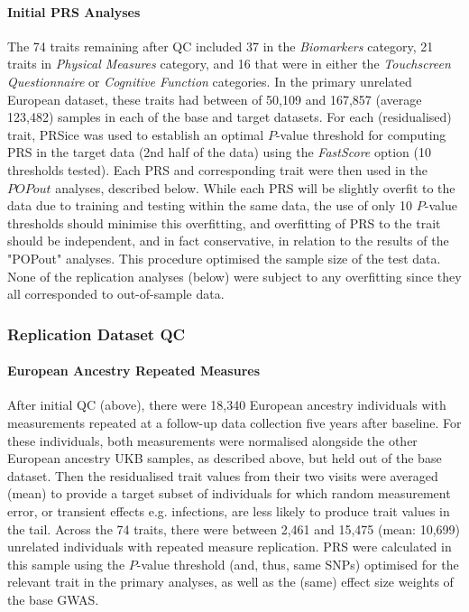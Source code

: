 \documentclass[12pt]{zHenriquesLab-StyleBioRxiv}
\begin{document}
\paragraph*{Initial PRS Analyses}
The 74 traits remaining after QC included 37 in the \textit{Biomarkers} category, 
21 traits in \textit{Physical Measures} category, and 16 that were in either 
the \textit{Touchscreen Questionnaire} or \textit{Cognitive Function} categories.  
In the primary unrelated European dataset, these traits had between of 50,109 and 167,857 
(average 123,482) samples in each of the base and target datasets. For each (residualised) trait, 
PRSice \cite{prsice} was used to establish an optimal $P$-value threshold for computing PRS in 
the target data (2nd half of the data) using the \textit{FastScore} option (10 thresholds tested). 
Each PRS and corresponding trait were then used in the $POPout$ analyses, described below. 
While each PRS will be slightly overfit to the data due to training and testing within the same data, 
the use of only 10 $P$-value thresholds should minimise this overfitting, and overfitting of PRS 
to the trait should be independent, and in fact conservative, in relation to the results of 
the "POPout" analyses. This procedure optimised the sample size of the test data. None of the replication 
analyses (below) were subject to any overfitting since they all corresponded to out-of-sample data. 
%
\subsubsection*{Replication Dataset QC} \label{sec:methods:rqc} 
\paragraph*{European Ancestry Repeated Measures}
After initial QC (above), there were 18,340 European ancestry individuals 
with measurements repeated at a follow-up data collection five years after baseline. 
For these individuals, both measurements were normalised alongside 
the other European ancestry UKB samples, as described above, but held out of the base dataset. Then 
the residualised trait values from their two visits were averaged (mean) to provide a 
target subset of individuals for which random measurement error, or transient 
effects e.g. infections, are less likely to produce trait values in the tail. 
Across the 74 traits, there were between 2,461 and 15,475 (mean: 10,699) unrelated 
individuals with repeated measure replication.  PRS were calculated in this sample 
using the $P$-value threshold (and, thus, same SNPs) optimised for the relevant 
trait in the primary analyses, as well as the (same) effect size weights of the base GWAS. 
\end{document}
